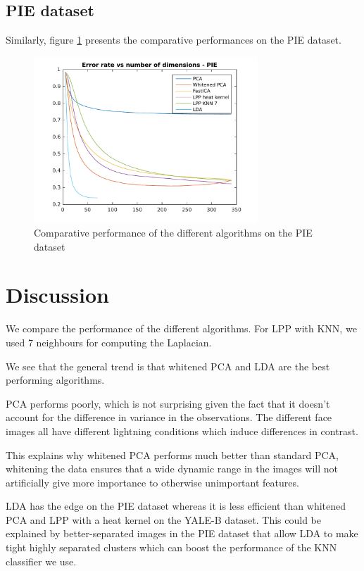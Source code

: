 \documentclass[10pt, a4paper]{article}
\begin{document}
\subsection{PIE dataset}
Similarly, figure \ref{pie_all} presents the comparative performances on the PIE dataset.
\begin{figure}[h!]
\centering
\includegraphics[width=0.75\textwidth]{pie/pie_all}
\caption{Comparative performance of the different algorithms on the PIE dataset}
\label{pie_all}
\end{figure}

\section{Discussion}

We compare the performance of the different algorithms. For LPP with KNN, we used 7 neighbours for computing the Laplacian.

We see that the general trend is that whitened PCA and LDA are the best performing algorithms.

PCA performs poorly, which is not surprising given the fact that it doesn't account for the difference in variance in the observations. The different face images all have different lightning conditions which induce differences in contrast.

This explains why whitened PCA performs much better than standard PCA, whitening the data ensures that a wide dynamic range in the images will not artificially give more importance to otherwise unimportant features.

LDA has the edge on the PIE dataset whereas it is less efficient than whitened PCA and LPP with a heat kernel on the YALE-B dataset. This could be explained by better-separated images in the PIE dataset that allow LDA to make tight highly separated clusters which can boost the performance of the KNN classifier we use.
\end{document}
